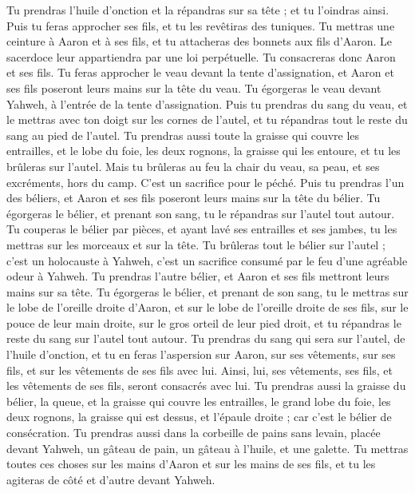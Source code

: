\begin{multicols}{2}
Tu prendras l'huile d'onction et la répandras sur sa tête ; et tu l'oindras ainsi.
Puis tu feras approcher ses fils, et tu les revêtiras des tuniques.
Tu mettras une ceinture à Aaron et à ses fils, et tu attacheras des bonnets aux fils d’Aaron. Le sacerdoce leur appartiendra par une loi perpétuelle. Tu consacreras donc Aaron et ses fils.
Tu feras approcher le veau devant la tente d'assignation, et Aaron et ses fils poseront leurs mains sur la tête du veau.
Tu égorgeras le veau devant Yahweh, à l'entrée de la tente d'assignation.
Puis tu prendras du sang du veau, et le mettras avec ton doigt sur les cornes de l'autel, et tu répandras tout le reste du sang au pied de l'autel.
Tu prendras aussi toute la graisse qui couvre les entrailles, et le lobe du foie, les deux rognons, la graisse qui les entoure, et tu les brûleras sur l'autel.
Mais tu brûleras au feu la chair du veau, sa peau, et ses excréments, hors du camp. C'est un sacrifice pour le péché.
Puis tu prendras l'un des béliers, et Aaron et ses fils poseront leurs mains sur la tête du bélier.
Tu égorgeras le bélier, et prenant son sang, tu le répandras sur l'autel tout autour.
Tu couperas le bélier par pièces, et ayant lavé ses entrailles et ses jambes, tu les mettras sur les morceaux et sur la tête.
Tu brûleras tout le bélier sur l'autel ; c'est un holocauste à Yahweh, c’est un sacrifice consumé par le feu d’une agréable odeur à Yahweh.
Tu prendras l'autre bélier, et Aaron et ses fils mettront leurs mains sur sa tête.
Tu égorgeras le bélier, et prenant de son sang, tu le mettras sur le lobe de l'oreille droite d'Aaron, et sur le lobe de l'oreille droite de ses fils, sur le pouce de leur main droite, sur le gros orteil de leur pied droit, et tu répandras le reste du sang sur l'autel tout autour.
Tu prendras du sang qui sera sur l'autel, de l'huile d'onction, et tu en feras l’aspersion sur Aaron, sur ses vêtements, sur ses fils, et sur les vêtements de ses fils avec lui. Ainsi, lui, ses vêtements, ses fils, et les vêtements de ses fils, seront consacrés avec lui.
Tu prendras aussi la graisse du bélier, la queue, et la graisse qui couvre les entrailles, le grand lobe du foie, les deux rognons, la graisse qui est dessus, et l'épaule droite ; car c'est le bélier de consécration.
Tu prendras aussi dans la corbeille de pains sans levain, placée devant Yahweh, un gâteau de pain, un gâteau à l'huile, et une galette.
Tu mettras toutes ces choses sur les mains d’Aaron et sur les mains de ses fils, et tu les agiteras de côté et d’autre devant Yahweh.

\end{multicols}

